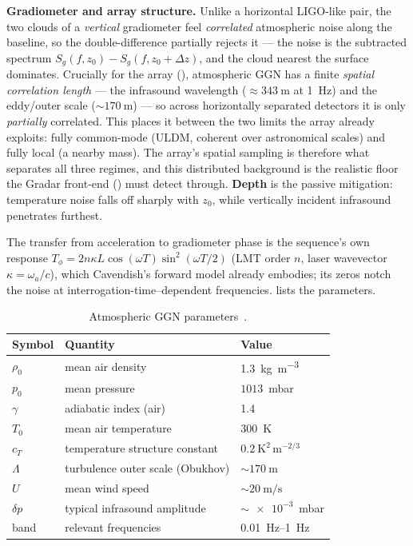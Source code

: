 \documentclass[11pt,a4paper]{article}
\theoremstyle{reqstyle}
\begin{document}
\textbf{Gradiometer and array structure.} Unlike a horizontal LIGO-like pair, the two clouds of
a \emph{vertical} gradiometer feel \emph{correlated} atmospheric noise along the baseline, so the
double-difference partially rejects it --- the noise is the subtracted spectrum
$S_g(f,z_0)-S_g(f,z_0+\Delta z)$, and the cloud nearest the surface dominates. Crucially for the
array (), atmospheric GGN has a finite \emph{spatial correlation length} --- the
infrasound wavelength ($\approx\SI{343}{\metre}$ at \SI{1}{\hertz}) and the eddy/outer scale
($\sim\SI{170}{\metre}$) --- so across horizontally separated detectors it is only
\emph{partially} correlated. This places it between the two limits the array already exploits:
fully common-mode (ULDM, coherent over astronomical scales) and fully local (a nearby mass). The
array's spatial sampling is therefore what separates all three regimes, and this distributed
background is the realistic floor the Gradar front-end () must detect through.
\textbf{Depth} is the passive mitigation: temperature noise falls off sharply with $z_0$, while
vertically incident infrasound penetrates furthest.

The transfer from acceleration to gradiometer phase is the sequence's own response
$T_\phi = 2 n \kappa L \cos(\omega T)\sin^2(\omega T/2)$ (LMT order $n$, laser wavevector
$\kappa=\omega_a/c$), which Cavendish's forward model already embodies; its zeros notch the noise
at interrogation-time--dependent frequencies.  lists the parameters.

\begin{table}[h]
\centering
\caption{Atmospheric GGN parameters~\cite{carlton2025}.}
\label{tab:atmo}
\small
\begin{tabular}{@{}lll@{}}
\toprule
Symbol & Quantity & Value \\
\midrule
$\rho_0$  & mean air density                 & \SI{1.3}{\kilogram\per\cubic\metre}\\
$p_0$     & mean pressure                    & $\num{1013}$~mbar\\
$\gamma$  & adiabatic index (air)            & \num{1.4}\\
$T_0$     & mean air temperature             & \SI{300}{\kelvin}\\
$c_T$     & temperature structure constant   & $\num{0.2}\ \mathrm{K^2\,m^{-2/3}}$\\
$\Lambda$ & turbulence outer scale (Obukhov) & $\sim\SI{170}{\metre}$\\
$U$       & mean wind speed                  & $\sim\SI{20}{\metre\per\second}$\\
$\delta p$& typical infrasound amplitude     & $\sim\num{e-3}$~mbar\\
band      & relevant frequencies             & \SIrange{0.01}{1}{\hertz}\\
\bottomrule
\end{tabular}
\end{table}
\end{document}
